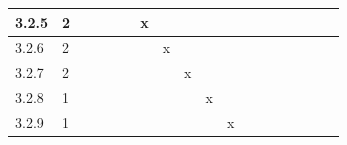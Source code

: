 \documentclass[runningheads,a4paper]{article}
\begin{document}
\begin{table}[]
\begin{tabular}{llllllllllllllllll}
\multicolumn{1}{|l|}{3.2.5}        & \multicolumn{1}{l|}{2}        & \multicolumn{1}{l|}{}    & \multicolumn{1}{l|}{}    & \multicolumn{1}{l|}{}    & \multicolumn{1}{l|}{}    & \multicolumn{1}{l|}{x}   & \multicolumn{1}{l|}{}    & \multicolumn{1}{l|}{}    & \multicolumn{1}{l|}{}    & \multicolumn{1}{l|}{}    & \multicolumn{1}{l|}{}     & \multicolumn{1}{l|}{}     & \multicolumn{1}{l|}{}     & \multicolumn{1}{l|}{}     & \multicolumn{1}{l|}{}     & \multicolumn{1}{l|}{}     & \multicolumn{1}{l|}{}     \\ \hline
\multicolumn{1}{|l|}{3.2.6}        & \multicolumn{1}{l|}{2}        & \multicolumn{1}{l|}{}    & \multicolumn{1}{l|}{}    & \multicolumn{1}{l|}{}    & \multicolumn{1}{l|}{}    & \multicolumn{1}{l|}{}    & \multicolumn{1}{l|}{x}   & \multicolumn{1}{l|}{}    & \multicolumn{1}{l|}{}    & \multicolumn{1}{l|}{}    & \multicolumn{1}{l|}{}     & \multicolumn{1}{l|}{}     & \multicolumn{1}{l|}{}     & \multicolumn{1}{l|}{}     & \multicolumn{1}{l|}{}     & \multicolumn{1}{l|}{}     & \multicolumn{1}{l|}{}     \\ \hline
\multicolumn{1}{|l|}{3.2.7}        & \multicolumn{1}{l|}{2}        & \multicolumn{1}{l|}{}    & \multicolumn{1}{l|}{}    & \multicolumn{1}{l|}{}    & \multicolumn{1}{l|}{}    & \multicolumn{1}{l|}{}    & \multicolumn{1}{l|}{}    & \multicolumn{1}{l|}{x}   & \multicolumn{1}{l|}{}    & \multicolumn{1}{l|}{}    & \multicolumn{1}{l|}{}     & \multicolumn{1}{l|}{}     & \multicolumn{1}{l|}{}     & \multicolumn{1}{l|}{}     & \multicolumn{1}{l|}{}     & \multicolumn{1}{l|}{}     & \multicolumn{1}{l|}{}     \\ \hline
\multicolumn{1}{|l|}{3.2.8}        & \multicolumn{1}{l|}{1}        & \multicolumn{1}{l|}{}    & \multicolumn{1}{l|}{}    & \multicolumn{1}{l|}{}    & \multicolumn{1}{l|}{}    & \multicolumn{1}{l|}{}    & \multicolumn{1}{l|}{}    & \multicolumn{1}{l|}{}    & \multicolumn{1}{l|}{x}   & \multicolumn{1}{l|}{}    & \multicolumn{1}{l|}{}     & \multicolumn{1}{l|}{}     & \multicolumn{1}{l|}{}     & \multicolumn{1}{l|}{}     & \multicolumn{1}{l|}{}     & \multicolumn{1}{l|}{}     & \multicolumn{1}{l|}{}     \\ \hline
\multicolumn{1}{|l|}{3.2.9}        & \multicolumn{1}{l|}{1}        & \multicolumn{1}{l|}{}    & \multicolumn{1}{l|}{}    & \multicolumn{1}{l|}{}    & \multicolumn{1}{l|}{}    & \multicolumn{1}{l|}{}    & \multicolumn{1}{l|}{}    & \multicolumn{1}{l|}{}    & \multicolumn{1}{l|}{}    & \multicolumn{1}{l|}{x}   & \multicolumn{1}{l|}{}     & \multicolumn{1}{l|}{}     & \multicolumn{1}{l|}{}     & \multicolumn{1}{l|}{}     & \multicolumn{1}{l|}{}     & \multicolumn{1}{l|}{}     & \multicolumn{1}{l|}{}     \\ \hline

\end{tabular}
\end{table}
\end{document}
